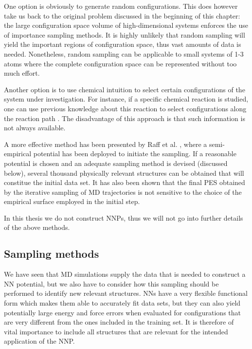 \documentclass[twoside,english]{uiofysmaster}
\begin{document}
One option is obviously to generate random configurations. This does however take us back to the 
original problem discussed in the beginning of this chapter: the large configuration space volume of
high-dimensional systems enforces the use of importance sampling methods. 
It is highly unlikely that random sampling will yield the important regions of configuration space, thus 
vast amounts of data is needed. Nonetheless, random sampling can be applicable to small systems of 1-3 atoms where
the complete configuration space can be represented without too much effort. 

Another option is to use chemical intuition to select certain configurations of 
the system under investigation. 
For instance, if a specific chemical reaction is studied, one can use previous knowledge about this reaction to 
select configurations along the reaction path \cite{Ischtwan94}. The disadvantage of this approach is that
such information is not always available. 

A more effective method has been presented by Raff et al. \cite{Raff05}, where a semi-empirical
potential has been deployed to initiate the sampling. If a reasonable potential is chosen and an adequate
sampling method is devised (discussed below), several thousand physically relevant structures can be obtained
that will constitue the initial data set. It has also been shown \cite{Raff05} that the final PES obtained 
by the iterative sampling of MD trajectories is not sensitive to the choice of the empirical surface employed 
in the initial step. 

In this thesis we do not construct  NNPs, thus we will not go into further details
of the above methods. 

\subsection{Sampling methods}
We have seen that MD simulations supply the data that is needed to construct a NN potential, but we 
also have to consider how this sampling should be performed to identify new relevant structures.
NNs have a very flexible functional form which makes them able to accurately fit data sets, 
but they can also yield potentially large energy and force errors 
when evaluated for configurations that are very different from the ones included in the training set.
It is therefore of vital importance to include all structures that are relevant for the intended
application of the NNP. 
\end{document}
